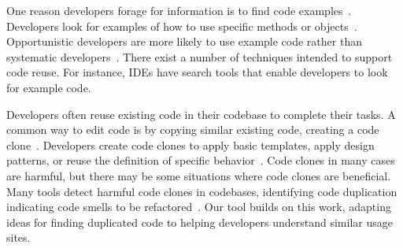 \documentclass[conference]{IEEEtran}
\begin{document}
One reason developers forage for information is to find code examples~\cite{rosson1996reuse, brandt2009two}. Developers look for examples of how to use specific methods or objects~\cite{stylos2006mica,umarji2008archetypal}. Opportunistic developers are more likely to use example code rather than systematic developers~\cite{head2018not}. There exist a number of techniques intended to support code reuse. For instance, IDEs have search tools that enable developers to look for example code.\par

Developers often reuse existing code in their codebase to complete their tasks. A common way to edit code is by copying similar existing code, creating a code clone~\cite{codeCloneDetection2019,hou2009cnp}. Developers create code clones to apply basic templates, apply design patterns, or reuse the definition of specific behavior~\cite{kim2004ethnographic,kapser2008cloning}. Code clones in many cases are harmful, but there may be some situations where code clones are beneficial.  Many tools detect harmful code clones in codebases, identifying code duplication indicating code smells to be refactored~\cite{bellon2007comparison}. Our tool builds on this work, adapting ideas for finding duplicated code to helping developers understand similar usage sites.\par


\end{document}
